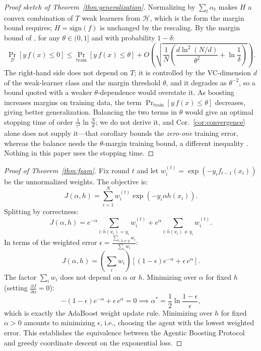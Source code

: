 \begin{proof}[Proof sketch of Theorem~\ref{thm:generalization}]
Normalizing by $\sum_t\alpha_t$ makes $H$ a convex combination of $T$ weak learners from $\mathcal{H}$, which is the form the margin bound requires; $H=\mathrm{sign}(f)$ is unchanged by the rescaling. By the margin bound of \citet{schapire1998boosting}, for any $\theta \in (0,1]$ and with probability $1 - \delta$:
\[
\Pr_{\mathcal{D}}[y \, f(x) \leq 0] \leq \Pr_{\mathrm{train}}[y \, f(x) \leq \theta] + O\!\left(\sqrt{\frac{1}{N}\left(\frac{d \ln^2(N/d)}{\theta^2} + \ln\frac{1}{\delta}\right)}\right).
\]
The right-hand side does not depend on $T$; it is controlled by the VC-dimension $d$ of the weak-learner class and the margin threshold $\theta$, and it degrades as $\theta^{-2}$, so a bound quoted with a weaker $\theta$-dependence would overstate it. As boosting increases margins on training data, the term $\Pr_{\mathrm{train}}[y\,f(x)\leq\theta]$ decreases, giving better generalization. Balancing the two terms in $\theta$ would give an optimal stopping time of order $\frac{1}{\gamma^2}\ln\frac{N}{d}$; we do not derive it, and Cor.~\ref{cor:convergence} alone does not supply it---that corollary bounds the \emph{zero-one} training error, whereas the balance needs the $\theta$-margin training bound, a different inequality \citep{schapire1998boosting}. Nothing in this paper uses the stopping time.
\end{proof}

\begin{proof}[Proof of Theorem~\ref{thm:fsam}]
Fix round $t$ and let $w_i^{(t)} = \exp(-y_i f_{t-1}(x_i))$ be the unnormalized weights. The objective is:
\[
J(\alpha, h) = \sum_{i=1}^N w_i^{(t)} \exp(-y_i \alpha h(x_i)).
\]
Splitting by correctness:
\[
J(\alpha, h) = e^{-\alpha} \sum_{i: h(x_i) = y_i} w_i^{(t)} + e^{\alpha} \sum_{i: h(x_i) \neq y_i} w_i^{(t)}.
\]
In terms of the weighted error $\epsilon = \frac{\sum_{i: h \neq y} w_i}{\sum_i w_i}$:
\[
J(\alpha, h) = \left(\sum_i w_i\right) \left[ (1 - \epsilon) e^{-\alpha} + \epsilon \, e^{\alpha} \right].
\]
The factor $\sum_i w_i$ does not depend on $\alpha$ or $h$. Minimizing over $\alpha$ for fixed $h$ (setting $\frac{\partial J}{\partial \alpha} = 0$):
\[
-(1-\epsilon) e^{-\alpha} + \epsilon \, e^{\alpha} = 0 \implies \alpha^* = \frac{1}{2}\ln\frac{1 - \epsilon}{\epsilon},
\]
which is exactly the AdaBoost weight update rule. Minimizing over $h$ for fixed $\alpha > 0$ amounts to minimizing $\epsilon$, i.e., choosing the agent with the lowest weighted error. This establishes the equivalence between the Agentic Boosting Protocol and greedy coordinate descent on the exponential loss.
\end{proof}

